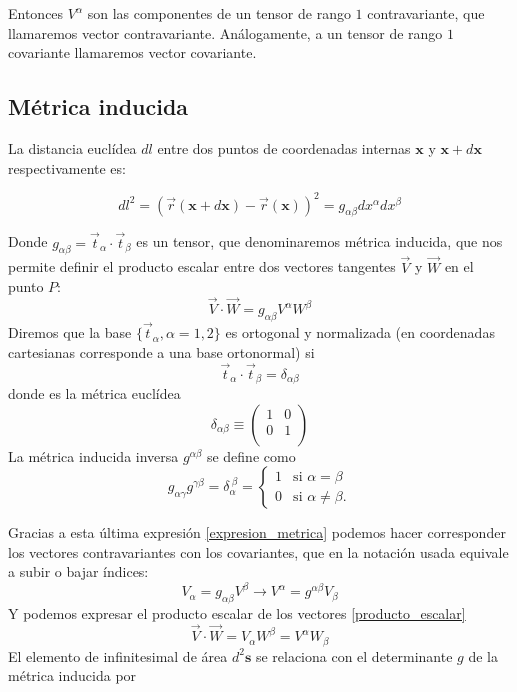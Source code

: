 Entonces $V^{\alpha}$ son las componentes de un tensor de rango $1$
contravariante, que llamaremos vector contravariante. Análogamente, a un tensor
de rango $1$ covariante llamaremos vector covariante.
 
\subsection{Métrica inducida}

La distancia euclídea $dl$ entre dos puntos de coordenadas internas
$\mathbf{x}$ y $\mathbf{x}+d\mathbf{x}$ respectivamente es:

\begin{equation}\label{elemento_linea}
dl^2=(\vec{r}(\mathbf{x}+d\mathbf{x})-\vec{r}(\mathbf{x}))^2=g_{\alpha\beta}dx^{\alpha}dx^{\beta}
\end{equation}

Donde $g_{\alpha\beta}=\vec{t}_{\alpha}\cdot\vec{t}_{\beta}$ es un tensor, que
denominaremos métrica inducida, que nos permite definir el producto escalar
entre dos vectores tangentes $\vec{V}$ y $\vec{W}$ en el punto $P$:
\begin{equation}\label{producto_escalar}
\vec{V}\cdot\vec{W}=g_{\alpha\beta}V^{\alpha}W^{\beta}
\end{equation}
Diremos que la base $\{ \vec{t}_{\alpha}, \alpha=1,2\}$ es ortogonal y
normalizada (en coordenadas cartesianas corresponde a una base ortonormal) si
\begin{equation*}
\vec{t}_{\alpha}\cdot\vec{t}_{\beta}=\delta_{\alpha\beta}
\end{equation*}
donde es la métrica euclídea
\begin{equation*}
\delta_{\alpha\beta}\equiv\left(\begin{array}{cc}
1&0\\
0&1\\
\end{array}\right)
\end{equation*}
La métrica inducida inversa $g^{\alpha\beta}$ se define como
\begin{equation}\label{expresion_metrica}
g_{\alpha\gamma}g^{\gamma\beta}=\delta_{\alpha}^{\ \beta}=\begin{cases}
1&\text{si $\alpha=\beta$}\\
0&\text{si $\alpha\neq\beta$}.
\end{cases}
\end{equation}

Gracias a esta última expresión \eqref{expresion_metrica} podemos hacer
corresponder los vectores contravariantes con los covariantes, que en la
notación usada equivale a subir o bajar índices:
\begin{equation*}
V_{\alpha}=g_{\alpha\beta}V^{\beta}\rightarrow V^{\alpha}=g^{\alpha\beta}V_{\beta} 
\end{equation*}
Y podemos expresar el producto escalar de los vectores
\eqref{producto_escalar} 
\begin{equation*}
\vec{V}\cdot\vec{W}=V_{\alpha}W^{\beta}=V^{\alpha}W_{\beta}
\end{equation*}
El elemento de infinitesimal de área $d^2\mathbf{s}$ se relaciona con el
determinante $g$ de la métrica inducida por

